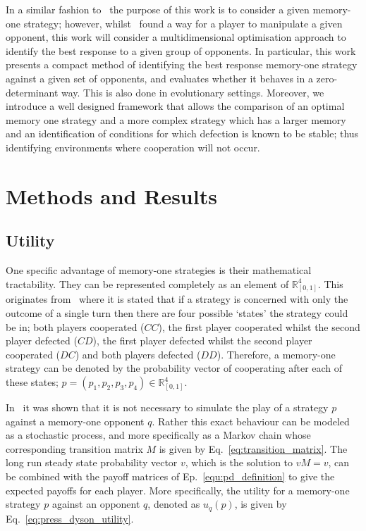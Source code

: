 \documentclass[9pt,twocolumn,twoside,lineno]{pnas-new}
\newcommand{\R}{\mathbb{R}}
\begin{document}
In a similar fashion to~\cite{Press2012} the purpose of this work is to consider
a given memory-one strategy; however, whilst~\cite{Press2012} found a way for a
player to manipulate a given opponent, this work will consider a
multidimensional optimisation approach to identify the best response to a given
group of opponents. In particular, this work presents a compact method of
identifying the best response memory-one strategy against a given set of
opponents, and evaluates whether it behaves in a
zero-determinant way. This is also done in evolutionary settings. Moreover, we
introduce a well designed framework that allows the comparison of an optimal
memory one strategy and a more complex strategy which has a larger memory and an
identification of conditions for which defection is known to be stable; thus
identifying environments where cooperation will not occur.

\section*{Methods and Results}
\subsection*{Utility}

One specific advantage of memory-one strategies is their mathematical
tractability. They can be represented completely as an element of \(\R^{4}_{[0, 1]}\). This
originates from~\cite{Nowak1989} where it is stated that if a strategy is
concerned with only the outcome of a single turn then there are four possible
`states' the strategy could be in; both players cooperated (\(CC\)), 
the first player cooperated whilst the second player defected (\(CD\)),
the first player defected whilst the second player cooperated (\(DC\)) and
both players defected (\(DD\)).
Therefore, a memory-one strategy can be denoted by the probability vector of
cooperating after each of these states; \(p=(p_1, p_2, p_3, p_4) \in \R_{[0,1]}
^ 4\).

In~\cite{Nowak1989} it was shown that it is not necessary to simulate the play
of a strategy $p$ against a memory-one opponent $q$. Rather this exact behaviour
can be modeled as a stochastic process, and more specifically as a Markov chain
whose corresponding transition matrix \(M\) is
given by Eq.~\ref{eq:transition_matrix}. The long run steady state probability
vector \(v\), which is the solution to \(v M = v\), can be
combined with the payoff matrices of Ep.~\ref{equ:pd_definition} to give the expected
payoffs for each player. More specifically, the utility for a memory-one
strategy \(p\) against an opponent \(q\), denoted as \(u_q(p)\), is given by
Eq.~\ref{eq:press_dyson_utility}.
\end{document}
